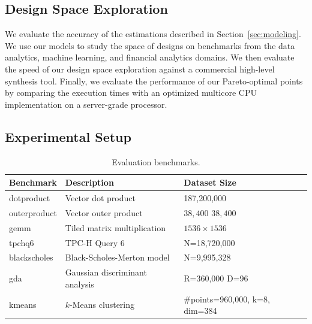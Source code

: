 \subsection{Design Space Exploration}

We evaluate the accuracy of the estimations described in Section~\ref{sec:modeling}. We use our models to
study the space of designs on benchmarks from the data analytics,
machine learning, and financial analytics domains. We then evaluate the speed of our design
space exploration against a commercial high-level synthesis tool.
Finally, we evaluate the performance of our
Pareto-optimal points by comparing the execution times with an optimized multicore CPU implementation on a server-grade processor.
\subsection{Experimental Setup}

\begin{table}
\centering\footnotesize
\begin{tabular}{lm{3.6cm}m{2cm}}
\toprule

{\bf Benchmark} & {\bf Description} & {\bf Dataset Size} \\ \midrule
dotproduct   & Vector dot product & 187,200,000\\ \midrule
outerproduct & Vector outer product & $38,400$ $38,400$ \\ \midrule
gemm         & Tiled matrix multiplication & $1536 \times 1536$\\ \midrule
tpchq6       & TPC-H Query 6 & N=18,720,000 \\ \midrule
blackscholes & Black-Scholes-Merton model & N=9,995,328 \\ \midrule
gda         & Gaussian discriminant analysis & R=360,000 D=96 \\ \midrule
kmeans & $k$-Means clustering & \#points=960,000, k=8, dim=384 \\ \midrule
\end{tabular}
\caption{Evaluation benchmarks.}
\label{t:benchmarks}
\end{table}

